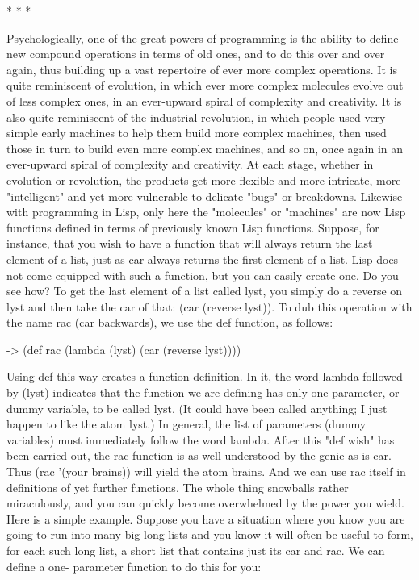                                         *   *   *

        Psychologically, one of the great powers of programming is the ability to
define new compound operations in terms of old ones, and to do this over and over
again, thus building up a vast repertoire of ever more complex operations. It is quite
reminiscent of evolution, in which ever more complex molecules evolve out of less
complex ones, in an ever-upward spiral of complexity and creativity. It is also quite
reminiscent of the industrial revolution, in which people used very simple early
machines to help them build more complex machines, then used those in turn to build
even more complex machines, and so on, once again in an ever-upward spiral of
complexity and creativity. At each stage, whether in evolution or revolution, the
products get more flexible and more intricate, more "intelligent" and yet more
vulnerable to delicate "bugs" or breakdowns.
        Likewise with programming in Lisp, only here the "molecules" or "machines"
are now Lisp functions defined in terms of previously known Lisp functions. Suppose,
for instance, that you wish to have a function that will always return the last element
of a list, just as car always returns the first element of a list. Lisp does not come
equipped with such a function, but you can easily create one. Do you see how? To get
the last element of a list called lyst, you simply do a reverse on lyst and then take the
car of that: (car (reverse lyst)). To dub this operation with the name rac (car
backwards), we use the def function, as follows:

-> (def rac (lambda (lyst) (car (reverse lyst))))

Using def this way creates a function definition. In it, the word lambda followed by
(lyst) indicates that the function we are defining has only one parameter, or dummy
variable, to be called lyst. (It could have been called anything; I just happen to like the
atom lyst.) In general, the list of parameters (dummy variables) must immediately
follow the word lambda. After this "def wish" has been carried out, the rac function
is as well understood by the genie as is car. Thus (rac '(your brains)) will yield the
atom brains. And we can use rac itself in definitions of yet further functions. The
whole thing snowballs rather miraculously, and you can quickly become
overwhelmed by the power you wield.
Here is a simple example. Suppose you have a situation where you know you are
going to run into many big long lists and you know it will often be useful to form, for
each such long list, a short list that contains just its car and rac. We can define a one-
parameter function to do this for you:




